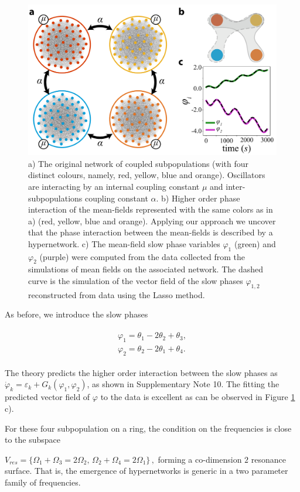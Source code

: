 \documentclass[12pt]{article}
\theoremstyle{plain}
\theoremstyle{definition}
\theoremstyle{remark}
\theoremstyle{remark}
\begin{document}
{\begin{figure}[htp!]
    \centering
    \includegraphics[width=0.6\columnwidth]{mf_comms3.pdf}
    \caption{{\color{black}{\bf Interacting subpopulations lead to higher order interaction of mean-fields.}  a) The original network of coupled subpopulations (with four distinct colours, namely, red, yellow, blue and orange). Oscillators are interacting by an internal coupling constant $\mu$ and inter-subpopulations coupling constant $\alpha$. b) Higher order phase interaction of the  mean-fields represented with the same colors as in a) (red, yellow, blue and orange).  Applying our approach we uncover that the phase interaction between the mean-fields is described by a hypernetwork. c) The mean-field slow phase variables $\varphi_{1}$ (green) and $\varphi_{2}$ (purple) were computed from the data collected from the simulations of mean fields on the associated network. The  dashed curve is the simulation of the vector field of the slow phases $\varphi_{1,2}$ reconstructed from data using the Lasso method.}}
\label{OAE}
\end{figure}

As before, we introduce the slow phases
\begin{linenomath}
\begin{eqnarray}
\begin{split}
\varphi_1 = \theta_1 -2 \theta_2  +\theta_3,  \\
\varphi_2 = \theta_2 -2 \theta_1 + \theta_4.
\end{split}
\end{eqnarray}
\end{linenomath}
The theory predicts the higher order interaction between the slow phases as $\dot{\varphi}_k = \varepsilon_k + G_k(\varphi_1,\varphi_2)$, as shown in {Supplementary Note 10}. The fitting the predicted vector field of $\varphi$ to the data is excellent as can be observed in {Figure \ref{OAE} c).}  


For these four subpopulation on a ring, the condition on the frequencies is close to the subspace 

$
V_{res} = \{ \Omega_1 + \Omega_3 = 2\Omega_2, \, \Omega_2 + \Omega_4 =  2\Omega_1\}\,, 
$
forming a co-dimension $2$ resonance surface.  That is, the emergence of hypernetworks is generic in a two parameter family of frequencies.
}
\end{document}
